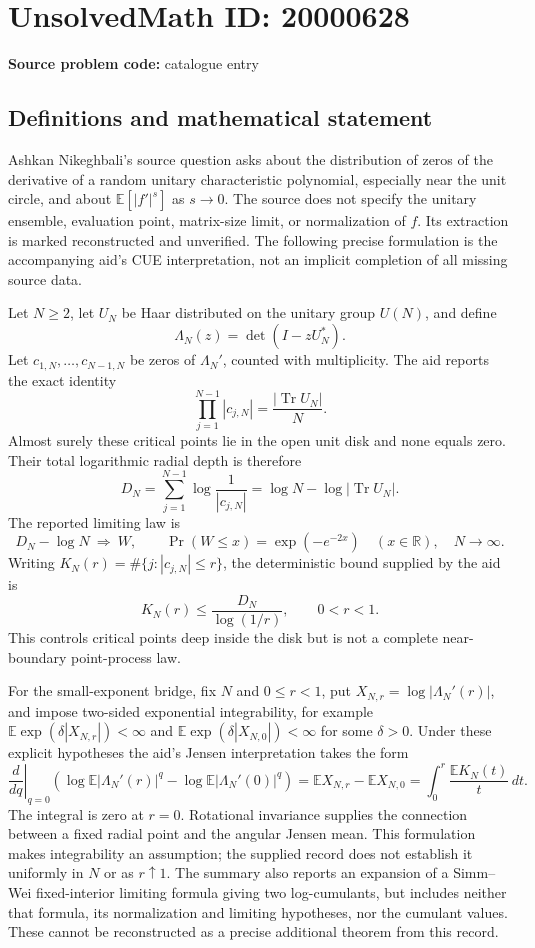 \documentclass[11pt]{article}
\newcommand{\R}{\mathbb{R}}
\newcommand{\E}{\mathbb{E}}
\begin{document}
\section*{UnsolvedMath ID: 20000628}
\textbf{Source problem code:} catalogue entry
\subsection{Definitions and mathematical statement}
Ashkan Nikeghbali's source question asks about the distribution of zeros of the derivative of a random unitary characteristic polynomial, especially near the unit circle, and about $\E[|f'|^s]$ as $s\to0$. The source does not specify the unitary ensemble, evaluation point, matrix-size limit, or normalization of $f$. Its extraction is marked reconstructed and unverified. The following precise formulation is the accompanying aid's CUE interpretation, not an implicit completion of all missing source data.

Let $N\geq2$, let $U_N$ be Haar distributed on the unitary group $U(N)$, and define
\[
 \Lambda_N(z)=\det(I-zU_N^*).
\]
Let $c_{1,N},\ldots,c_{N-1,N}$ be zeros of $\Lambda_N'$, counted with multiplicity. The aid reports the exact identity
\[
 \prod_{j=1}^{N-1}|c_{j,N}|=\frac{|\operatorname{Tr}U_N|}{N}.
\]
Almost surely these critical points lie in the open unit disk and none equals zero. Their total logarithmic radial depth is therefore
\[
 D_N=\sum_{j=1}^{N-1}\log\frac1{|c_{j,N}|}
     =\log N-\log|\operatorname{Tr}U_N|.
\]
The reported limiting law is
\[
 D_N-\log N\ \Longrightarrow\ W,\qquad
 \Pr(W\leq x)=\exp(-e^{-2x})\quad(x\in\R),\quad N\to\infty.
\]
Writing $K_N(r)=\#\{j:|c_{j,N}|\leq r\}$, the deterministic bound supplied by the aid is
\[
 K_N(r)\leq\frac{D_N}{\log(1/r)},\qquad 0<r<1.
\]
This controls critical points deep inside the disk but is not a complete near-boundary point-process law.

For the small-exponent bridge, fix $N$ and $0\leq r<1$, put $X_{N,r}=\log|\Lambda_N'(r)|$, and impose two-sided exponential integrability, for example $\E\exp(\delta|X_{N,r}|)<\infty$ and $\E\exp(\delta|X_{N,0}|)<\infty$ for some $\delta>0$. Under these explicit hypotheses the aid's Jensen interpretation takes the form
\[
 \left.\frac{d}{dq}\right|_{q=0}
 \left(\log\E|\Lambda_N'(r)|^q-\log\E|\Lambda_N'(0)|^q\right)
 =\E X_{N,r}-\E X_{N,0}
 =\int_0^r\frac{\E K_N(t)}{t}\,dt.
\]
The integral is zero at $r=0$. Rotational invariance supplies the connection between a fixed radial point and the angular Jensen mean. This formulation makes integrability an assumption; the supplied record does not establish it uniformly in $N$ or as $r\uparrow1$. The summary also reports an expansion of a Simm--Wei fixed-interior limiting formula giving two log-cumulants, but includes neither that formula, its normalization and limiting hypotheses, nor the cumulant values. These cannot be reconstructed as a precise additional theorem from this record.
\end{document}
